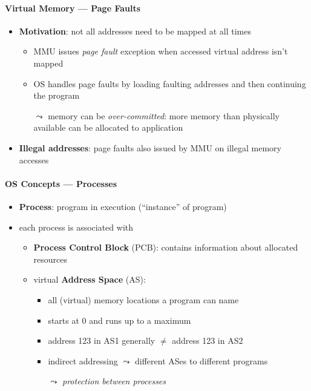 \paragraph{Virtual Memory --- Page Faults}
\begin{itemize}
	\item \textbf{Motivation}: not all addresses need to be mapped at all times
	\begin{itemize}
		\item MMU issues \emph{page fault} exception when accessed virtual address isn't mapped
		\item OS handles page faults by loading faulting addresses and then continuing the program
		\item[$ \leadsto $] memory can be \emph{over-committed}: more memory than physically available can be allocated to application
	\end{itemize}
	\item \textbf{Illegal addresses}: page faults also issued by MMU on illegal memory accesses
\end{itemize}

\paragraph{OS Concepts --- Processes}
\begin{itemize}
	\item \textbf{Process}: program in execution (``instance'' of program)
	\item each process is associated with
	\begin{itemize}
		\item \textbf{Process Control Block} (PCB): contains information about allocated resources
		\item virtual \textbf{Address Space} (AS):
		\begin{itemize}
			\item all (virtual) memory locations a program can name
			\item starts at 0 and runs up to a maximum
			\item address 123 in AS1 generally $ \neq $ address 123 in AS2
			\item indirect addressing $ \leadsto $ different ASes to different programs
			\item[$ \leadsto $] \emph{protection between processes}
		\end{itemize}
	\end{itemize}
\end{itemize}

